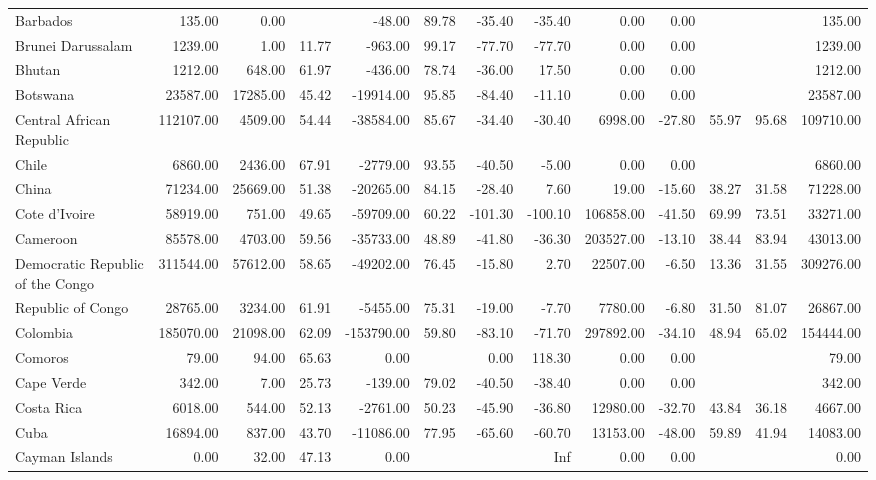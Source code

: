 \begin{table}[ht]
\begin{tabular}{lrrrrrrrrrrrr}
  Barbados & 135.00 & 0.00 &  & -48.00 & 89.78 & -35.40 & -35.40 & 0.00 & 0.00 &  &  & 135.00 \\ 
  Brunei Darussalam & 1239.00 & 1.00 & 11.77 & -963.00 & 99.17 & -77.70 & -77.70 & 0.00 & 0.00 &  &  & 1239.00 \\ 
  Bhutan & 1212.00 & 648.00 & 61.97 & -436.00 & 78.74 & -36.00 & 17.50 & 0.00 & 0.00 &  &  & 1212.00 \\ 
  Botswana & 23587.00 & 17285.00 & 45.42 & -19914.00 & 95.85 & -84.40 & -11.10 & 0.00 & 0.00 &  &  & 23587.00 \\ 
  Central African Republic & 112107.00 & 4509.00 & 54.44 & -38584.00 & 85.67 & -34.40 & -30.40 & 6998.00 & -27.80 & 55.97 & 95.68 & 109710.00 \\ 
  Chile & 6860.00 & 2436.00 & 67.91 & -2779.00 & 93.55 & -40.50 & -5.00 & 0.00 & 0.00 &  &  & 6860.00 \\ 
  China & 71234.00 & 25669.00 & 51.38 & -20265.00 & 84.15 & -28.40 & 7.60 & 19.00 & -15.60 & 38.27 & 31.58 & 71228.00 \\ 
  Cote d'Ivoire & 58919.00 & 751.00 & 49.65 & -59709.00 & 60.22 & -101.30 & -100.10 & 106858.00 & -41.50 & 69.99 & 73.51 & 33271.00 \\ 
  Cameroon & 85578.00 & 4703.00 & 59.56 & -35733.00 & 48.89 & -41.80 & -36.30 & 203527.00 & -13.10 & 38.44 & 83.94 & 43013.00 \\ 
  Democratic Republic of the Congo & 311544.00 & 57612.00 & 58.65 & -49202.00 & 76.45 & -15.80 & 2.70 & 22507.00 & -6.50 & 13.36 & 31.55 & 309276.00 \\ 
  Republic of Congo & 28765.00 & 3234.00 & 61.91 & -5455.00 & 75.31 & -19.00 & -7.70 & 7780.00 & -6.80 & 31.50 & 81.07 & 26867.00 \\ 
  Colombia & 185070.00 & 21098.00 & 62.09 & -153790.00 & 59.80 & -83.10 & -71.70 & 297892.00 & -34.10 & 48.94 & 65.02 & 154444.00 \\ 
  Comoros & 79.00 & 94.00 & 65.63 & 0.00 &  & 0.00 & 118.30 & 0.00 & 0.00 &  &  & 79.00 \\ 
  Cape Verde & 342.00 & 7.00 & 25.73 & -139.00 & 79.02 & -40.50 & -38.40 & 0.00 & 0.00 &  &  & 342.00 \\ 
  Costa Rica & 6018.00 & 544.00 & 52.13 & -2761.00 & 50.23 & -45.90 & -36.80 & 12980.00 & -32.70 & 43.84 & 36.18 & 4667.00 \\ 
  Cuba & 16894.00 & 837.00 & 43.70 & -11086.00 & 77.95 & -65.60 & -60.70 & 13153.00 & -48.00 & 59.89 & 41.94 & 14083.00 \\ 
  Cayman Islands & 0.00 & 32.00 & 47.13 & 0.00 &  &  & Inf & 0.00 & 0.00 &  &  & 0.00 \\ 

\end{tabular}
\end{table}
